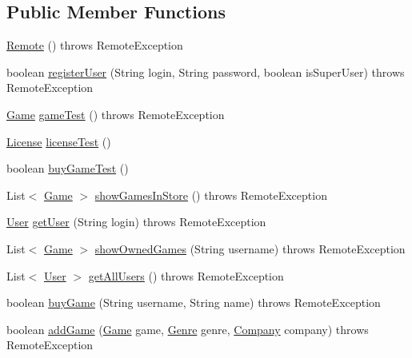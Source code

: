 \subsection*{Public Member Functions}
\begin{DoxyCompactItemize}
\item 
\hyperlink{classes_1_1deusto_1_1server_1_1remote_1_1_remote_a39055ae30196c2afe97a621b80e43374}{Remote} ()  throws Remote\+Exception 
\item 
boolean \hyperlink{classes_1_1deusto_1_1server_1_1remote_1_1_remote_a5a130e99a06078d7d6fe186597e91d41}{register\+User} (String login, String password, boolean is\+Super\+User)  throws Remote\+Exception 
\item 
\hyperlink{classes_1_1deusto_1_1server_1_1db_1_1data_1_1_game}{Game} \hyperlink{classes_1_1deusto_1_1server_1_1remote_1_1_remote_a6fb46c2635427f798b75c8ab124b54da}{game\+Test} ()  throws Remote\+Exception
\item 
\hyperlink{classes_1_1deusto_1_1server_1_1db_1_1data_1_1_license}{License} \hyperlink{classes_1_1deusto_1_1server_1_1remote_1_1_remote_a58e6d2180aeea8259ea29392ffe70b8b}{license\+Test} ()
\item 
boolean \hyperlink{classes_1_1deusto_1_1server_1_1remote_1_1_remote_abf7e74962d613440fcac6c2c55110163}{buy\+Game\+Test} ()
\item 
List$<$ \hyperlink{classes_1_1deusto_1_1server_1_1db_1_1data_1_1_game}{Game} $>$ \hyperlink{classes_1_1deusto_1_1server_1_1remote_1_1_remote_ae40a5882d6b3ef3d5928d87dafeb15fa}{show\+Games\+In\+Store} ()  throws Remote\+Exception 
\item 
\hyperlink{classes_1_1deusto_1_1server_1_1db_1_1data_1_1_user}{User} \hyperlink{classes_1_1deusto_1_1server_1_1remote_1_1_remote_a09318956131f355c8b43f93e3c3afea4}{get\+User} (String login)  throws Remote\+Exception
\item 
List$<$ \hyperlink{classes_1_1deusto_1_1server_1_1db_1_1data_1_1_game}{Game} $>$ \hyperlink{classes_1_1deusto_1_1server_1_1remote_1_1_remote_a73569877f9317fc48a4e134977baa304}{show\+Owned\+Games} (String username)  throws Remote\+Exception 
\item 
List$<$ \hyperlink{classes_1_1deusto_1_1server_1_1db_1_1data_1_1_user}{User} $>$ \hyperlink{classes_1_1deusto_1_1server_1_1remote_1_1_remote_a5c284c933c6f1f9651634dc764e526d5}{get\+All\+Users} ()  throws Remote\+Exception 
\item 
boolean \hyperlink{classes_1_1deusto_1_1server_1_1remote_1_1_remote_ad9f8ad426b1162504b7b39eb1c86d2a3}{buy\+Game} (String username, String name)  throws Remote\+Exception 
\item 
boolean \hyperlink{classes_1_1deusto_1_1server_1_1remote_1_1_remote_a1ecaa4a69094e3f3410720b54027e5b3}{add\+Game} (\hyperlink{classes_1_1deusto_1_1server_1_1db_1_1data_1_1_game}{Game} game, \hyperlink{classes_1_1deusto_1_1server_1_1db_1_1data_1_1_genre}{Genre} genre, \hyperlink{classes_1_1deusto_1_1server_1_1db_1_1data_1_1_company}{Company} company)  throws Remote\+Exception 
\end{DoxyCompactItemize}
